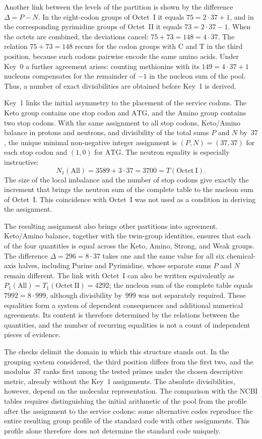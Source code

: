 \documentclass[11pt,a4paper]{article}
\renewcommand{\_}{\origunderscore\allowbreak}
\begin{document}
Another link between the levels of the partition is shown by
the difference $\Delta=P-N$. In the eight-codon groups of
Octet~I it equals $75=2\cdot37+1$, and in the corresponding
pyrimidine groups of Octet~II it equals $73=2\cdot37-1$.
When the octets are combined, the deviations cancel:
$75+73=148=4\cdot37$. The relation $75+73=148$ recurs for the
codon groups with $\mathrm{C}$ and $\mathrm{T}$ in the third
position, because such codons pairwise encode the same amino
acids. Under Key~0 a further agreement arises: counting
methionine with its $149=4\cdot37+1$ nucleons compensates for
the remainder of $-1$ in the nucleon sum of the pool. Thus,
a number of exact divisibilities are obtained before Key~1 is
derived.

Key~1 links the initial asymmetry to the placement of the
service codons. The Keto group contains one stop codon and
$\mathrm{ATG}$, and the Amino group contains two stop codons.
With the same assignment to all stop codons, Keto/Amino balance
in protons and neutrons, and divisibility of the total sums $P$
and $N$ by~$37$, the unique minimal non-negative integer
assignment is $(P,N)=(37,37)$ for each stop codon and $(1,0)$
for $\mathrm{ATG}$. The neutron equality is especially
instructive:
\[
N_1(\mathrm{All})=3589+3\cdot37
                 =3700=T(\mathrm{Octet~I}).
\]
The size of the local imbalance and the number of stop codons
give exactly the increment that brings the neutron sum of the
complete table to the nucleon sum of Octet~I. This coincidence
with Octet~I was not used as a condition in deriving the
assignment.

The resulting assignment also brings other partitions into
agreement. Keto/Amino balance, together with the twin-group
identities, ensures that each of the four quantities is equal
across the Keto, Amino, Strong, and Weak groups. The difference
$\Delta=296=8\cdot37$ takes one and the same value for all six
chemical-axis halves, including Purine and Pyrimidine, whose
separate sums $P$ and $N$ remain different. The link with
Octet~I can also be written equivalently as
$P_1(\mathrm{All})=T_1(\mathrm{Octet~II})=4292$; the nucleon
sum of the complete table equals $7992=8\cdot999$, although
divisibility by~$999$ was not separately required.
These equalities form a system of dependent consequences and
additional numerical agreements. Its content is therefore
determined by the relations between the quantities, and the
number of recurring equalities is not a count of independent
pieces of evidence.

The checks delimit the domain in which this structure stands
out. In the grouping system considered, the third position
differs from the first two, and the modulus~$37$ ranks first
among the tested primes under the chosen descriptive metric,
already without the Key~1 assignments. The absolute
divisibilities, however, depend on the molecular representation.
The comparison with the NCBI tables requires distinguishing the
initial arithmetic of the pool from the profile after the
assignment to the service codons: some alternative codes
reproduce the entire resulting group profile of the standard
code with other assignments. This profile alone therefore does
not determine the standard code uniquely.
\end{document}
